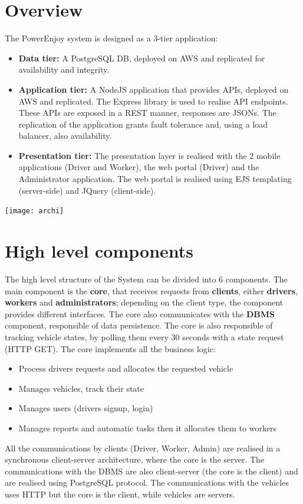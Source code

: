 \section{Overview}
The PowerEnjoy system is designed as a 3-tier application:
\begin{itemize}
\item \textbf{Data tier:} A PostgreSQL DB, deployed on AWS and replicated for availability and integrity. 
\item \textbf{Application tier:} A NodeJS application that provides APIs, deployed on AWS and replicated. The Express library is used to realise API endpoints. These APIs are exposed in a REST manner, responses are JSONs. The replication of the application grants fault tolerance and, using a load balancer, also availability.
\item \textbf{Presentation tier:} The presentation layer is realised with the 2 mobile applications (Driver and Worker), the web portal (Driver) and the Administrator application. The web portal is realised using EJS templating (server-side) and JQuery (client-side).
\end{itemize}
\texttt{[image: archi]}
\newpage
\section{High level components}
The high level structure of the System can be divided into 6 components. The main component is the \textbf{core}, that receives requests from \textbf{clients}, either \textbf{drivers}, \textbf{workers} and \textbf{administrators}; depending on the client type, the component provides different interfaces. 
The core also communicates with the \textbf{DBMS} component, responsible of data persistence. 
The core is also responsible of tracking vehicle states, by polling them every 30 seconds with a state request (HTTP GET).
The core implements all the business logic: 
\begin{itemize}
\item Process drivers requests and allocates the requested vehicle 
\item Manages vehicles, track their state
\item Manages users (drivers signup, login)
\item Manages reports and automatic tasks then it allocates them to workers
\end{itemize}
All the communications by clients (Driver, Worker, Admin) are realised in a synchronous client-server architecture, where the core is the server. The communications with the DBMS are also client-server (the core is the client) and are realised using PostgreSQL protocol. The communications with the vehicles uses HTTP but the core is the client, while vehicles are servers.

